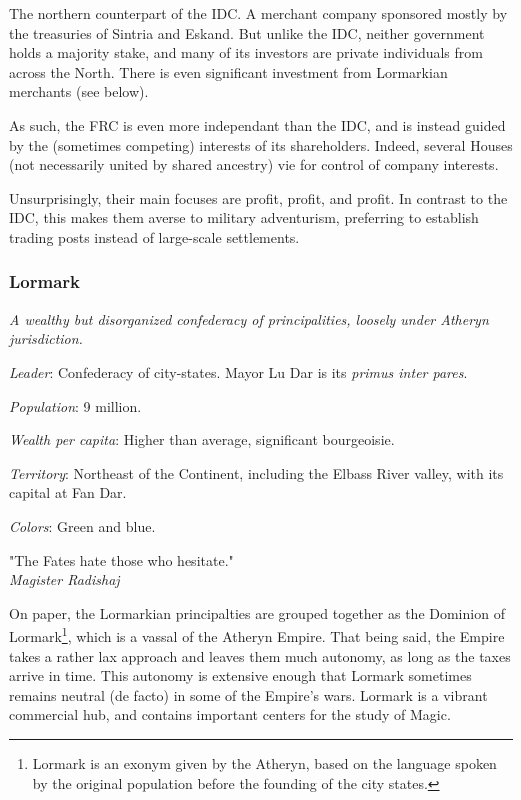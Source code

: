 The northern counterpart of the IDC. A merchant company sponsored mostly by the treasuries of Sintria and Eskand. But unlike the IDC, neither government holds a majority stake, and many of its investors are private individuals from across the North. There is even significant investment from Lormarkian merchants (see below).

As such, the FRC is even more independant than the IDC, and is instead guided by the (sometimes competing) interests of its shareholders. Indeed, several Houses (not necessarily united by shared ancestry) vie for control of company interests.

Unsurprisingly, their main focuses are profit, profit, and profit. In contrast to the IDC, this makes them averse to military adventurism, preferring to establish trading posts instead of large-scale settlements.



\subsubsection{Lormark}

\textit{A wealthy but disorganized confederacy of principalities, loosely under Atheryn jurisdiction.}

\textit{Leader}: Confederacy of city-states. Mayor Lu Dar is its \textit{primus inter pares}.

\textit{Population}: 9 million.

\textit{Wealth per capita}: Higher than average, significant bourgeoisie.

\textit{Territory}: Northeast of the Continent, including the Elbass River valley, with its capital at Fan Dar.
    
\textit{Colors}: Green and blue.


\begin{rpg-quotebox}
"The Fates hate those who hesitate." \\ \textendash \textit{Magister Radishaj}
\end{rpg-quotebox}


On paper, the Lormarkian principalties are grouped together as the Dominion of Lormark\footnote{Lormark is an exonym given by the Atheryn, based on the language spoken by the original population before the founding of the city states.}, which is a vassal of the Atheryn Empire. That being said, the Empire takes a rather lax approach and leaves them much autonomy, as long as the taxes arrive in time. This autonomy is extensive enough that Lormark sometimes remains neutral (de facto) in some of the Empire's wars. Lormark is a vibrant commercial hub, and contains important centers for the study of Magic.

